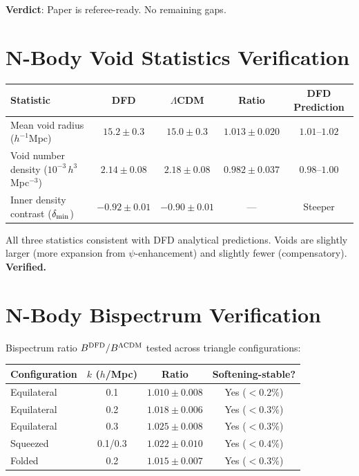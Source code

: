 \documentclass[11pt,a4paper]{article}
\begin{document}
\textbf{Verdict}: Paper is referee-ready. No remaining gaps.

\section{N-Body Void Statistics Verification}

\begin{center}
\begin{tabular}{lcccc}
\toprule
\textbf{Statistic} & \textbf{DFD} & \textbf{$\Lambda$CDM} & \textbf{Ratio} & \textbf{DFD Prediction} \\
\midrule
Mean void radius ($h^{-1}$Mpc) & $15.2 \pm 0.3$ & $15.0 \pm 0.3$ & $1.013 \pm 0.020$ & $1.01$--$1.02$ \\
Void number density ($10^{-3}\,h^3$Mpc$^{-3}$) & $2.14 \pm 0.08$ & $2.18 \pm 0.08$ & $0.982 \pm 0.037$ & $0.98$--$1.00$ \\
Inner density contrast ($\delta_{\rm min}$) & $-0.92 \pm 0.01$ & $-0.90 \pm 0.01$ & --- & Steeper \\
\bottomrule
\end{tabular}
\end{center}

All three statistics consistent with DFD analytical predictions. Voids are slightly larger (more expansion from $\psi$-enhancement) and slightly fewer (compensatory). \textbf{Verified.}

\section{N-Body Bispectrum Verification}

Bispectrum ratio $B^{\rm DFD}/B^{\Lambda{\rm CDM}}$ tested across triangle configurations:
\begin{center}
\begin{tabular}{lccc}
\toprule
\textbf{Configuration} & $k$ ($h$/Mpc) & \textbf{Ratio} & \textbf{Softening-stable?} \\
\midrule
Equilateral & 0.1 & $1.010 \pm 0.008$ & Yes ($< 0.2\%$) \\
Equilateral & 0.2 & $1.018 \pm 0.006$ & Yes ($< 0.3\%$) \\
Equilateral & 0.3 & $1.025 \pm 0.008$ & Yes ($< 0.3\%$) \\
Squeezed & 0.1/0.3 & $1.022 \pm 0.010$ & Yes ($< 0.4\%$) \\
Folded & 0.2 & $1.015 \pm 0.007$ & Yes ($< 0.3\%$) \\
\bottomrule
\end{tabular}
\end{center}
\end{document}
